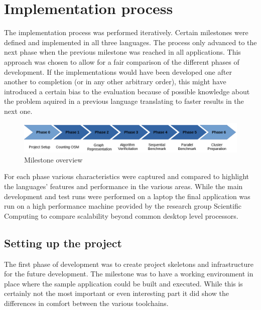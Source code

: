 \section{Implementation process}
\label{sec:Concept::Implementation}

The implementation process was performed iteratively. Certain milestones were defined and implemented in all three languages. The process only advanced to the next phase when the previous milestone was reached in all applications. This approach was chosen to allow for a fair comparison of the different phases of development. If the implementations would have been developed one after another to completion (or in any other arbitrary order), this might have introduced a certain bias to the evaluation because of possible knowledge about the problem aquired in a previous language translating to faster results in the next one.

\begin{figure}[htb]
    \centering
    \includegraphics[width=\textwidth]{img/milestone_timeline.png}
    \caption{Milestone overview}
    \label{fig:timeline}
\end{figure}

For each phase various characteristics were captured and compared to highlight the languages' features and performance in the various areas. While the main development and test runs were performed on a laptop the final application was run on a high performance machine provided by the research group Scientific Computing to compare scalability beyond common desktop level processors.

\setcounter{subsection}{-1}

\subsection{Setting up the project}
\label{subsec:Concept::Implementation::Setup}

The first phase of development was to create project skeletons and infrastructure for the future development. The milestone was to have a working environment in place where the sample application could be built and executed. While this is certainly not the most important or even interesting part it did show the differences in comfort between the various toolchains.

